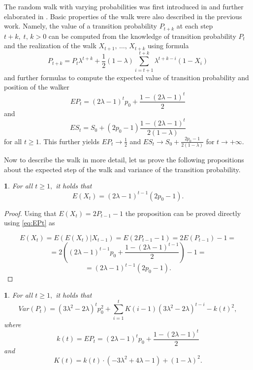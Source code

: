 \documentclass{amsart}
\theoremstyle{definition}
\theoremstyle{plain}
\newtheorem{prop}[thm]{\protect\propositionname}
\theoremstyle{plain}
\numberwithin{equation}{section}
\providecommand{\propositionname}{Proposition}
\begin{document}
The random walk with varying probabilities was first introduced in \cite{ja2017ddny} and further elaborated in \cite{ja2019teze}. Basic properties of the walk were also described in the previous work. 
Namely, the value of a transition probability $P_{t+k}$ at each step
$t+k,\;t,\,k>0$
can be computed from the knowledge of transition probability $P_{t}$
and the realization of the walk $X_{t+1},\,\dots,\,X_{t+k}$ using
formula 
\begin{equation}
P_{t+k}=P_{t}\lambda^{t+k}+\frac{1}{2}(1-\lambda)\sum_{i=t+1}^{t+k}\lambda^{t+k-i}(1-X_{i})\label{eq:Pt}
\end{equation} and further formulas to compute the expected value of transition probability and position of the walker
\begin{equation}
EP_{t}=(2\lambda-1)^{t}p_{0}+\frac{1-(2\lambda-1)^{t}}{2}\label{eq:EPt}
\end{equation}
and 
\begin{equation}
ES_{t}=S_{0}+(2p_{0}-1)\frac{1-(2\lambda-1)^{t}}{2(1-\lambda)}\label{eq:ESt}
\end{equation}
 for all $t\geq1$. This further yields $EP_{t}\rightarrow\frac{1}{2}$
and $ES_{t}\rightarrow S_{0}+\frac{2p_{0}-1}{2(1-\lambda)}$ for $t\rightarrow+\infty$.

Now to describe the walk in more detail, let us 
prove the following propositions about the expected step of the walk and variance of the transition probability.

\begin{prop}
For all $t\geq1,$ it holds that 
\begin{equation}
E(X_{t})=(2\lambda-1)^{t-1}(2p_{0}-1).
\end{equation}
\end{prop}
\begin{proof}
Using that $E(X_{t})=2P_{t-1}-1$ the proposition can be proved directly using \eqref{eq:EPt} as 

\[
E(X_{t})=E(E(X_{t})|X_{t-1})=E(2P_{t-1}-1)=2E(P_{t-1})-1=
\]
\[
=2((2\lambda-1)^{t-1}p_{0}+\frac{1-(2\lambda-1)^{t-1}}{2})-1=
\]
\[
=(2\lambda-1)^{t-1}(2p_{0}-1).
\]


\end{proof}

\begin{prop}
\label{PropVarP-succes}For all $t\geq1,$ it holds that 
\begin{equation}
Var(P_{t})=(3\lambda^{2}-2\lambda)^{t}p_{0}^{2}+\sum_{i=1}^{t}K(i-1)(3\lambda^{2}-2\lambda)^{t-i}-k(t)^{2},\label{eq:VarP-proposition}
\end{equation}
 where 
\[
k(t)=EP_{t}=(2\lambda-1)^{t}p_{0}+\frac{1-(2\lambda-1)^{t}}{2}
\]
 and 
\[
K(t)=k(t)\cdot(-3\lambda^{2}+4\lambda-1)+(1-\lambda)^{2}.
\]
\end{prop}
\end{document}
